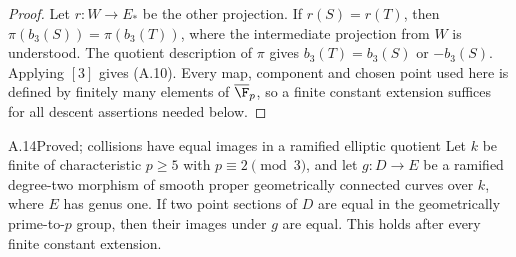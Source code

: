 \begin{proof}
Let $r:W\to E_*$ be the other projection. If $r(S)=r(T)$,
then $\pi(b_3(S))=\pi(b_3(T))$, where the intermediate
projection from $W$ is understood. The quotient description
of $\pi$ gives $b_3(T)=b_3(S)$ or $-b_3(S)$.
Applying $[3]$ gives (A.10). Every map, component and chosen
point used here is defined by finitely many elements of
$\overline{\F}_p$, so a finite constant extension suffices
for all descent assertions needed below.
\end{proof}

\begin{claim}{A.14}{Proved; collisions have equal images in a ramified elliptic quotient}
Let $k$ be finite of characteristic $p\ge5$ with
$p\equiv2\pmod3$, and let $g:D\to E$ be a ramified degree-two
morphism of smooth proper geometrically connected curves over
$k$, where $E$ has genus one. If two point sections of $D$
are equal in the geometrically prime-to-$p$ group, then their
images under $g$ are equal. This holds after every finite
constant extension.
\end{claim}
